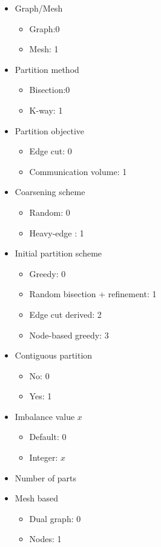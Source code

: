 \documentclass{cranfieldChart}
\begin{document}
\begin{itemize}
    \item Graph/Mesh 
    \begin{itemize}
        \item Graph:0
        \item Mesh: 1
    \end{itemize}
    \item Partition method
    \begin{itemize}
        \item Bisection:0
        \item K-way: 1
    \end{itemize}
    \item Partition objective
    \begin{itemize}
        \item Edge cut: 0
        \item Communication volume: 1
    \end{itemize}
    \item Coarsening scheme
    \begin{itemize}
        \item Random: 0
        \item Heavy-edge : 1
    \end{itemize}
    \item  Initial partition scheme
    \begin{itemize}
        \item Greedy: 0
        \item Random bisection + refinement: 1
        \item Edge cut derived: 2
        \item Node-based greedy: 3
    \end{itemize}
    \item Contiguous partition
    \begin{itemize}
        \item No: 0
        \item Yes: 1
    \end{itemize}
    \item Imbalance value $x$
    \begin{itemize}
        \item Default: 0
        \item Integer: $x$
    \end{itemize}
    \item Number of parts 
    \item Mesh based
    \begin{itemize}
        \item Dual graph: 0
        \item Nodes: 1
    \end{itemize}
\end{itemize}
\end{document}

